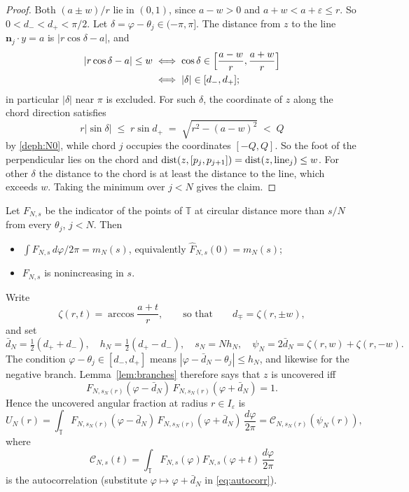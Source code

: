 \begin{proof}
Both $(a\pm w)/r$ lie in $(0,1)$, since $a-w>0$ and $a+w<a+\varepsilon\le r$. So $0<d_-<d_+<\pi/2$.
Let $\delta=\varphi-\theta_j\in(-\pi,\pi]$. The distance from $z$ to the line $\mathbf n_j\cdot y=a$ is $|r\cos\delta-a|$, and
\begin{align*}
|r\cos\delta-a|\le w
&\iff \cos\delta\in\Bigl[\frac{a-w}{r},\frac{a+w}{r}\Bigr]\\
&\iff |\delta|\in[d_-,d_+];
\end{align*}
in particular $|\delta|$ near $\pi$ is excluded.
For such $\delta$, the coordinate of $z$ along the chord direction satisfies
\[
r|\sin\delta|\;\le\; r\sin d_+\;=\;\sqrt{r^2-(a-w)^2}\;<\;Q
\]
by \eqref{deph:N0}, while chord $j$ occupies the coordinates $[-Q,Q]$. So the foot of the perpendicular lies on the chord and
$\operatorname{dist}(z,[p_j,p_{j+1}])=\operatorname{dist}(z,\text{line}_j)\le w$. For other $\delta$ the distance to the chord is at least the distance to the
line, which exceeds $w$. Taking the minimum over $j<N$ gives the claim.
\end{proof}

Let $F_{N,s}$ be the indicator of the points of $\mathbb T$ at circular distance more than $s/N$ from every $\theta_j$, $j<N$. Then
\begin{itemize}
\item $\int F_{N,s}\,d\varphi/2\pi=m_N(s)$, equivalently $\hat F_{N,s}(0)=m_N(s)$;
\item $F_{N,s}$ is nonincreasing in $s$.
\end{itemize}
Write
\[
\zeta(r,t)=\arccos\frac{a+t}{r},\qquad\text{so that}\qquad d_\mp=\zeta(r,\pm w),
\]
and set
\[
\bar d_N=\tfrac12(d_++d_-),\quad h_N=\tfrac12(d_+-d_-),\quad s_N=Nh_N,\quad \psi_N=2\bar d_N=\zeta(r,w)+\zeta(r,-w).
\]
The condition $\varphi-\theta_j\in[d_-,d_+]$ means $|\varphi-\bar d_N-\theta_j|\le h_N$, and likewise for the negative branch.
Lemma~\ref{lem:branches} therefore says that $z$ is uncovered iff
\[
F_{N,s_N(r)}(\varphi-\bar d_N)\,F_{N,s_N(r)}(\varphi+\bar d_N)=1 .
\]
Hence the uncovered angular fraction at radius $r\in I_\varepsilon$ is
\begin{equation}\label{eq:autocorr}
U_N(r)=\int_{\mathbb T}F_{N,s_N(r)}(\varphi-\bar d_N)\,F_{N,s_N(r)}(\varphi+\bar d_N)\,\frac{d\varphi}{2\pi}=\mathcal C_{N,s_N(r)}(\psi_N(r)),
\end{equation}
where
\[
\mathcal C_{N,s}(t)=\int_{\mathbb T} F_{N,s}(\varphi)F_{N,s}(\varphi+t)\,\frac{d\varphi}{2\pi}
\]
is the autocorrelation (substitute $\varphi\mapsto\varphi+\bar d_N$ in \eqref{eq:autocorr}).

